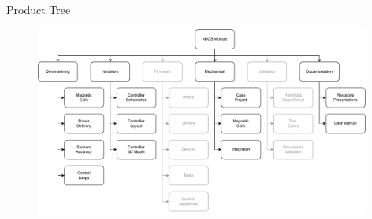 \documentclass{beamer}
\begin{document}
\begin{frame}{Product Tree}

    \begin{figure}[!ht]
        \begin{center}
            \includegraphics[width=11cm]{figures/product-tree-adcs.pdf}
        \end{center}
    \end{figure}

\end{frame}
\end{document}
